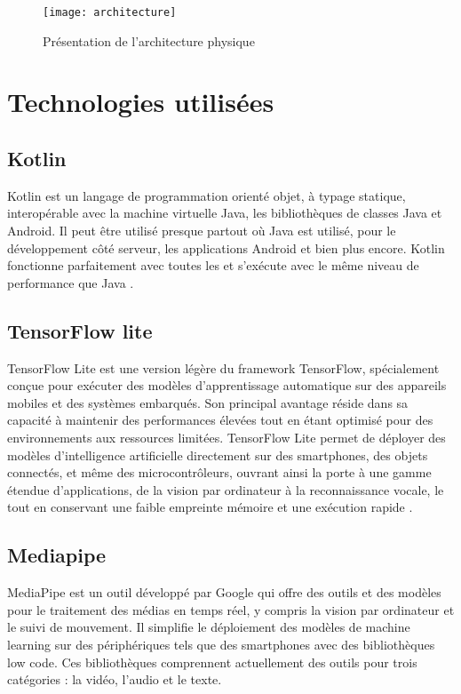\begin{figure}[H]
	\centering
	\texttt{[image: architecture]}
	\caption{Présentation de l'architecture physique}
\end{figure}

\section{Technologies utilisées}
\subsection{Kotlin}
Kotlin est un langage de programmation orienté objet, à typage statique, interopérable avec la machine virtuelle Java, les bibliothèques de classes Java et Android.
Il peut être utilisé presque partout où Java est utilisé, pour le développement côté serveur, les applications Android et bien plus encore. Kotlin fonctionne parfaitement avec toutes les et s'exécute avec le même niveau de performance que Java \cite{dmitry_jemerov_kotlin}.

\subsection{TensorFlow lite}
TensorFlow Lite est une version légère du framework TensorFlow, spécialement conçue pour exécuter des modèles d'apprentissage automatique sur des appareils mobiles et des systèmes embarqués. Son principal avantage réside dans sa capacité à maintenir des performances élevées tout en étant optimisé pour des environnements aux ressources limitées. TensorFlow Lite  permet de déployer des modèles d'intelligence artificielle directement sur des smartphones, des objets connectés, et même des microcontrôleurs, ouvrant ainsi la porte à une gamme étendue d'applications, de la vision par ordinateur à la reconnaissance vocale, le tout en conservant une faible empreinte mémoire et une exécution rapide \cite{ml_2023}.

\subsection{Mediapipe}
MediaPipe est un outil développé par Google qui offre des outils et des modèles pour le traitement des médias en temps réel, y compris la vision par ordinateur et le suivi de mouvement. Il simplifie le déploiement des modèles de machine learning sur des périphériques tels que des smartphones avec des bibliothèques low code. Ces bibliothèques comprennent actuellement des outils pour trois catégories : la vidéo, l'audio et le texte.

